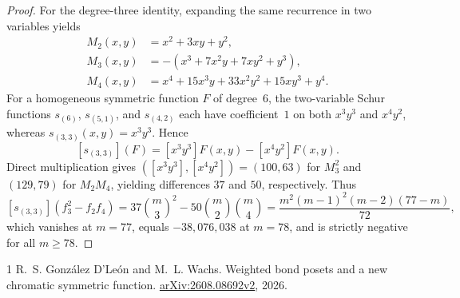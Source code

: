 \documentclass[11pt,letterpaper]{article}
\newcommand{\coef}[2]{[#1]\!\left(#2\right)}
\begin{document}
\begin{proof}
For the degree-three identity, expanding the same recurrence in two variables yields
\begin{align*}
M_2(x,y) &= x^2 + 3xy + y^2,\\
M_3(x,y) &= -(x^3 + 7x^2y + 7xy^2 + y^3),\\
M_4(x,y) &= x^4 + 15x^3y + 33x^2y^2 + 15xy^3 + y^4.
\end{align*}
For a homogeneous symmetric function $F$ of degree~$6$, the two-variable Schur functions $s_{(6)}$, $s_{(5,1)}$, and $s_{(4,2)}$ each have coefficient~$1$ on both $x^3y^3$ and $x^4y^2$, whereas $s_{(3,3)}(x,y) = x^3y^3$. Hence
\[
\coef{s_{(3,3)}}{F} = [x^3y^3]F(x,y) - [x^4y^2]F(x,y).
\]
Direct multiplication gives $([x^3y^3], [x^4y^2]) = (100, 63)$ for $M_3^2$ and $(129, 79)$ for $M_2M_4$, yielding differences $37$ and $50$, respectively. Thus
\[
\coef{s_{(3,3)}}{f_3^2 - f_2f_4}
= 37\binom{m}{3}^{\!2} - 50\binom{m}{2}\binom{m}{4}
= \frac{m^2(m-1)^2(m-2)(77-m)}{72},
\]
which vanishes at $m=77$, equals $-38{,}076{,}038$ at $m=78$, and is strictly negative for all $m \geq 78$.
\end{proof}

\begin{thebibliography}{1}
R.~S. Gonz\'alez D'Le\'on and M.~L. Wachs.
\newblock Weighted bond posets and a new chromatic symmetric function.
\newblock \href{https://arxiv.org/abs/2608.08692v2}{arXiv:2608.08692v2}, 2026.
\end{thebibliography}
\end{document}
